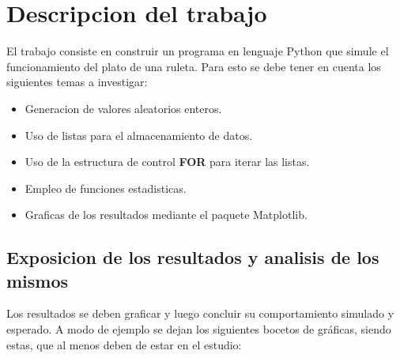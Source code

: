 \documentclass[onecolumn]{article}
\begin{document}
\section{Descripcion del trabajo}

El trabajo consiste en construir un programa en lenguaje Python que simule el funcionamiento  del plato de una ruleta. Para esto se debe tener en cuenta los siguientes temas a investigar:
\begin{itemize}
\item Generacion de valores aleatorios enteros.
\item Uso de listas para el almacenamiento de datos.
\item Uso de la estructura de control \textbf{FOR} para iterar las listas.
\item Empleo de funciones estadisticas.
\item Graficas de los resultados mediante el paquete Matplotlib.
\end{itemize}

\subsection{Exposicion de los resultados y analisis de los mismos}
\normalsize Los resultados se deben graficar y luego concluir su comportamiento simulado y esperado. A modo de ejemplo se dejan los siguientes bocetos de gráficas, siendo estas, que al menos deben de estar en el estudio: \\[2ex]
\end{document}
